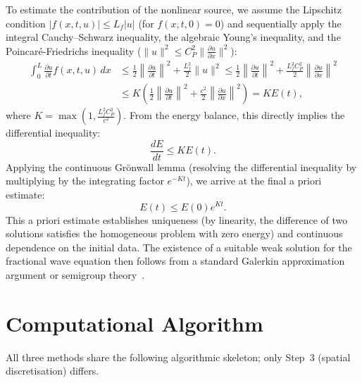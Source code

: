\documentclass[a4paper,fleqn]{cas-sc}
\begin{document}
\begin{appendix}
To estimate the contribution of the nonlinear source, we assume the Lipschitz condition $|f(x,t,u)| \le L_f |u|$ (for $f(x,t,0)=0$) and sequentially apply the integral Cauchy--Schwarz inequality, the algebraic Young's inequality, and the Poincar\'e-Friedrichs inequality ($\|u\|^2 \le C_P^2 \|\frac{\partial u}{\partial x}\|^2$):
\begin{align}
\int_0^L \frac{\partial u}{\partial t} f(x,t,u) \, dx &\le \frac{1}{2}\left\|\frac{\partial u}{\partial t}\right\|^2 + \frac{L_f^2}{2}\|u\|^2 \le \frac{1}{2}\left\|\frac{\partial u}{\partial t}\right\|^2 + \frac{L_f^2 C_P^2}{2}\left\|\frac{\partial u}{\partial x}\right\|^2 \\
&\le K \left( \frac{1}{2}\left\|\frac{\partial u}{\partial t}\right\|^2 + \frac{c^2}{2}\left\|\frac{\partial u}{\partial x}\right\|^2 \right) = K E(t),
\end{align}
where $K = \max\left(1, \frac{L_f^2 C_P^2}{c^2}\right)$. From the energy balance, this directly implies the differential inequality:
\begin{equation}
\frac{dE}{dt} \le K E(t).
\end{equation}
Applying the continuous Gr\"onwall lemma (resolving the differential inequality by multiplying by the integrating factor $e^{-Kt}$), we arrive at the final a priori estimate:
\begin{equation}
E(t) \le E(0) e^{K t}.
\end{equation}
This a priori estimate establishes uniqueness (by linearity, the difference of two solutions satisfies the homogeneous problem with zero energy) and continuous dependence on the initial data. The existence of a suitable weak solution for the fractional wave equation then follows from a standard Galerkin approximation argument or semigroup theory~\cite{sakamoto2011,mclean2010}.

\section{Computational Algorithm}\label{app:algorithm}

All three methods share the following algorithmic skeleton; only Step~3 (spatial discretisation) differs.


\end{appendix}
\end{document}
